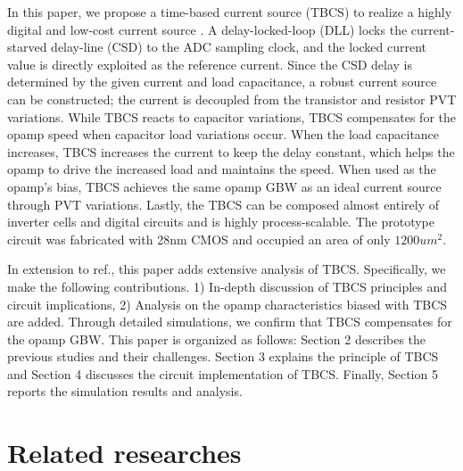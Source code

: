 \documentclass[paper]{ieice}
\begin{document}
In this paper, we propose a time-based current source (TBCS) to realize a highly digital and low-cost current source \cite{yoshioka201728}. A delay-locked-loop (DLL) locks the current-starved delay-line (CSD) to the ADC sampling clock, and the locked current value is directly exploited as the reference current. 
Since the CSD delay is determined by the given current and load capacitance, a robust current source can be constructed; the current is decoupled from the transistor and resistor PVT variations.
While TBCS reacts to capacitor variations, TBCS compensates for the opamp speed when capacitor load variations occur. 
When the load capacitance increases, TBCS increases the current to keep the delay constant, which helps the opamp to drive the increased load and maintains the speed. When used as the opamp's bias, TBCS achieves the same opamp GBW as an ideal current source through PVT variations.
Lastly, the TBCS can be composed almost entirely of inverter cells and digital circuits and is highly process-scalable. The prototype circuit was fabricated with 28nm CMOS and occupied an area of only $1200um^2$.

In extension to ref.\cite{yoshioka201728, yoshioka2019digital}, this paper adds extensive analysis of TBCS. Specifically, we make the following contributions. 1) In-depth discussion of TBCS principles and circuit implications, 2) Analysis on the opamp characteristics biased with TBCS are added. Through detailed simulations, we confirm that TBCS compensates for the opamp GBW. 
This paper is organized as follows: Section 2 describes the previous studies and their challenges. Section 3 explains the principle of TBCS and Section 4 discusses the circuit implementation of TBCS. Finally, Section 5 reports the simulation results and analysis.



\section{Related researches}
\end{document}
